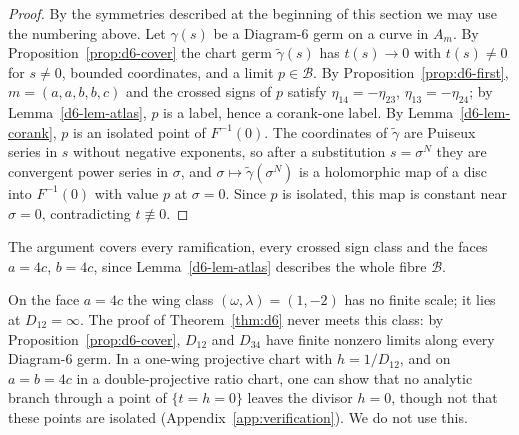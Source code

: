 \begin{proof}
By the symmetries described at the beginning of this section we may use the numbering above.  Let
$\gamma(s)$ be a Diagram-6 germ on a curve in $A_m$.  By Proposition~\ref{prop:d6-cover} the
chart germ $\tilde\gamma(s)$ has $t(s)\to0$ with $t(s)\ne0$ for $s\ne0$, bounded coordinates,
and a limit $p\in\mathcal B$.  By Proposition~\ref{prop:d6-first}, $m=(a,a,b,b,c)$ and the
crossed signs of $p$ satisfy $\eta_{14}=-\eta_{23}$, $\eta_{13}=-\eta_{24}$; by
Lemma~\ref{d6-lem-atlas}, $p$ is a label, hence a corank-one label.  By
Lemma~\ref{d6-lem-corank}, $p$ is an isolated point of $F^{-1}(0)$.  The coordinates of
$\tilde\gamma$ are Puiseux series in $s$ without negative exponents, so after a substitution
$s=\sigma^N$ they are convergent power series in $\sigma$, and $\sigma\mapsto\tilde\gamma(\sigma^N)$
is a holomorphic map of a disc into $F^{-1}(0)$ with value $p$ at $\sigma=0$.  Since $p$ is
isolated, this map is constant near $\sigma=0$, contradicting $t\not\equiv0$.
\end{proof}

The argument covers every ramification, every crossed sign class and the faces $a=4c$, $b=4c$,
since Lemma~\ref{d6-lem-atlas} describes the whole fibre $\mathcal B$.

\begin{remark}\label{d6-rem-projective}
On the face $a=4c$ the wing class $(\omega,\lambda)=(1,-2)$ has no finite scale; it lies at
$D_{12}=\infty$.  The proof of Theorem~\ref{thm:d6} never meets this class: by
Proposition~\ref{prop:d6-cover}, $D_{12}$ and $D_{34}$ have finite nonzero limits along every
Diagram-6 germ.  In a one-wing projective chart with $h=1/D_{12}$, and on $a=b=4c$ in a
double-projective ratio chart, one can show that no analytic branch through a point of
$\{t=h=0\}$ leaves the divisor $h=0$, though not that these points are isolated
(Appendix~\ref{app:verification}).  We do not use this.
\end{remark}
